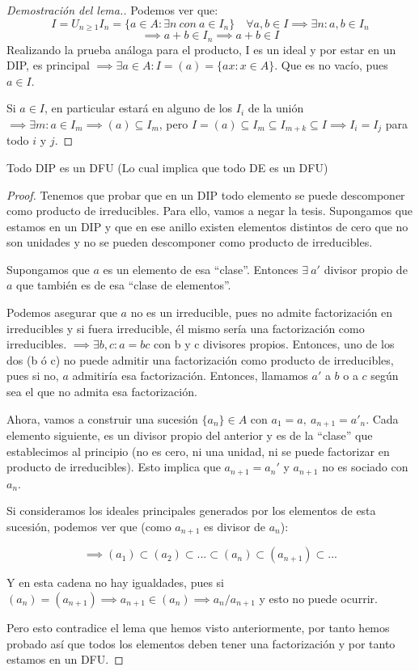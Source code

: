 	\begin{proof}[Demostración del lema.]
	Podemos ver que:
	\[
	I = U_{n\geq 1} I_n = \{a \in A : \exists n \ con \ a \in I_n\} \quad \forall a,b \in I \implies \exists n: a,b \in I_n\]\[ \implies a+b \in I_n \implies a+b \in I
	\]
	Realizando la prueba análoga para el producto, I es un ideal y por estar en un DIP, es principal $\implies \exists a \in A : I = (a) = \{ax : x \in A\}$. Que es no vacío, pues $a \in I$.

	Si $a\in I$, en particular estará en alguno de los $I_i$ de la unión $\implies \exists m : a \in I_m \implies (a) \subseteq I_m$, pero  $I = (a) \subseteq I_m \subseteq I_{m+k} \subseteq I \implies I_i = I_j$ para todo $i$ y $j$.

\end{proof}

\begin{nth}
	Todo DIP es un DFU (Lo cual implica que todo DE es un DFU)
\end{nth}
\begin{proof}
	Tenemos que probar que en un DIP todo elemento se puede descomponer como producto de irreducibles. Para ello, vamos a negar la tesis. Supongamos que estamos en un DIP y que en ese anillo existen elementos distintos de cero que no son unidades y no se pueden descomponer como producto de irreducibles.

	Supongamos que $a$ es un elemento de esa “clase”. Entonces $\exists  \ a'$ divisor propio de $a$ que también es de esa “clase de elementos”.

	Podemos asegurar que $a$ no es un irreducible, pues no admite factorización en irreducibles y si fuera irreducible, él mismo sería una factorización como irreducibles. $\implies \exists b,c : a = bc$ con b y c divisores propios. Entonces, uno de los dos (b ó c) no puede admitir una factorización como producto de irreducibles, pues si no, $a$ admitiría esa factorización. Entonces, llamamos $a'$ a $b$ o a $c$ según sea el que no admita esa factorización.

	Ahora, vamos a construir una sucesión $\{a_n\} \in A$ con $a_1 = a,\ a_{n+1}=a'_n$. Cada elemento siguiente, es un divisor propio del anterior y es de la “clase” que establecimos al principio (no es cero, ni una unidad, ni se puede factorizar en producto de irreducibles). Esto implica que $a_{n+1} = a_n'$ y $a_{n+1}$ no es sociado con $a_n$.

	Si consideramos los ideales principales generados por los elementos de esta sucesión, podemos ver que (como $a_{n+1}$ es divisor de $a_n$):

	\[
	\implies (a_1) \subset (a_2) \subset ... \subset (a_n) \subset (a_{n+1}) \subset ...	\]

	Y en esta cadena no hay igualdades, pues si $(a_n) = (a_{n+1}) \implies a_{n+1} \in (a_n) \implies a_n/ a_{n+1}$ y esto no puede ocurrir.

	Pero esto contradice el lema que hemos visto anteriormente, por tanto hemos probado así que todos los elementos deben tener una factorización y por tanto estamos en un DFU.
\end{proof}


